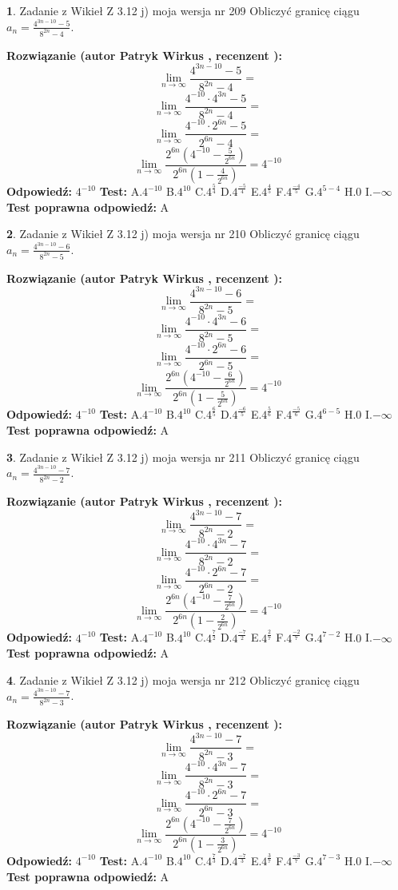 \documentclass[12pt, a4paper]{article}
\theoremstyle{definition} %
\newtheorem{zad}{}
\newcommand{\zadStart}[1]{\begin{zad}#1\newline}
\newcommand{\zadStop}{\end{zad}}
\newcommand{\rozwStart}[2]{\noindent \textbf{Rozwiązanie (autor #1 , recenzent #2): }\newline}
\newcommand{\rozwStop}{\newline}
\newcommand{\odpStart}{\noindent \textbf{Odpowiedź:}\newline}
\newcommand{\odpStop}{\newline}
\newcommand{\testStart}{\noindent \textbf{Test:}\newline}
\newcommand{\testStop}{\newline}
\newcommand{\kluczStart}{\noindent \textbf{Test poprawna odpowiedź:}\newline}
\newcommand{\kluczStop}{\newline}
\begin{document}
\zadStart{Zadanie z Wikieł Z 3.12 j) moja wersja nr 209}
Obliczyć granicę ciągu $a_{n}=\frac{4^{3n-10}-5}{8^{2n}-4}$.
\zadStop
\rozwStart{Patryk Wirkus}{}
$$\lim\limits_{n\to\infty}\frac{4^{3n-10}-5}{8^{2n}-4}=$$
$$\lim\limits_{n\to\infty}\frac{4^{-10} \cdot 4^{3n}-5}{8^{2n}-4}=$$
$$\lim\limits_{n\to\infty}\frac{4^{-10} \cdot 2^{6n}-5}{2^{6n}-4}=$$
$$\lim\limits_{n\to\infty}\frac{2^{6n}(4^{-10} - \frac{5}{2^{6n}})}{2^{6n}(1-\frac{4}{2^{6n}})}= 4^{-10}$$
\rozwStop
\odpStart
$4^{-10}$
\odpStop
\testStart
A.$4^{-10}$
B.$4^{10}$
C.$4^{\frac{5}{4}}$
D.$4^{\frac{-5}{4}}$
E.$4^{\frac{4}{5}}$
F.$4^{\frac{-4}{5}}$
G.$4^{5-4}$
H.$0$
I.$-\infty$
\testStop
\kluczStart
A
\kluczStop



\zadStart{Zadanie z Wikieł Z 3.12 j) moja wersja nr 210}
Obliczyć granicę ciągu $a_{n}=\frac{4^{3n-10}-6}{8^{2n}-5}$.
\zadStop
\rozwStart{Patryk Wirkus}{}
$$\lim\limits_{n\to\infty}\frac{4^{3n-10}-6}{8^{2n}-5}=$$
$$\lim\limits_{n\to\infty}\frac{4^{-10} \cdot 4^{3n}-6}{8^{2n}-5}=$$
$$\lim\limits_{n\to\infty}\frac{4^{-10} \cdot 2^{6n}-6}{2^{6n}-5}=$$
$$\lim\limits_{n\to\infty}\frac{2^{6n}(4^{-10} - \frac{6}{2^{6n}})}{2^{6n}(1-\frac{5}{2^{6n}})}= 4^{-10}$$
\rozwStop
\odpStart
$4^{-10}$
\odpStop
\testStart
A.$4^{-10}$
B.$4^{10}$
C.$4^{\frac{6}{5}}$
D.$4^{\frac{-6}{5}}$
E.$4^{\frac{5}{6}}$
F.$4^{\frac{-5}{6}}$
G.$4^{6-5}$
H.$0$
I.$-\infty$
\testStop
\kluczStart
A
\kluczStop



\zadStart{Zadanie z Wikieł Z 3.12 j) moja wersja nr 211}
Obliczyć granicę ciągu $a_{n}=\frac{4^{3n-10}-7}{8^{2n}-2}$.
\zadStop
\rozwStart{Patryk Wirkus}{}
$$\lim\limits_{n\to\infty}\frac{4^{3n-10}-7}{8^{2n}-2}=$$
$$\lim\limits_{n\to\infty}\frac{4^{-10} \cdot 4^{3n}-7}{8^{2n}-2}=$$
$$\lim\limits_{n\to\infty}\frac{4^{-10} \cdot 2^{6n}-7}{2^{6n}-2}=$$
$$\lim\limits_{n\to\infty}\frac{2^{6n}(4^{-10} - \frac{7}{2^{6n}})}{2^{6n}(1-\frac{2}{2^{6n}})}= 4^{-10}$$
\rozwStop
\odpStart
$4^{-10}$
\odpStop
\testStart
A.$4^{-10}$
B.$4^{10}$
C.$4^{\frac{7}{2}}$
D.$4^{\frac{-7}{2}}$
E.$4^{\frac{2}{7}}$
F.$4^{\frac{-2}{7}}$
G.$4^{7-2}$
H.$0$
I.$-\infty$
\testStop
\kluczStart
A
\kluczStop



\zadStart{Zadanie z Wikieł Z 3.12 j) moja wersja nr 212}
Obliczyć granicę ciągu $a_{n}=\frac{4^{3n-10}-7}{8^{2n}-3}$.
\zadStop
\rozwStart{Patryk Wirkus}{}
$$\lim\limits_{n\to\infty}\frac{4^{3n-10}-7}{8^{2n}-3}=$$
$$\lim\limits_{n\to\infty}\frac{4^{-10} \cdot 4^{3n}-7}{8^{2n}-3}=$$
$$\lim\limits_{n\to\infty}\frac{4^{-10} \cdot 2^{6n}-7}{2^{6n}-3}=$$
$$\lim\limits_{n\to\infty}\frac{2^{6n}(4^{-10} - \frac{7}{2^{6n}})}{2^{6n}(1-\frac{3}{2^{6n}})}= 4^{-10}$$
\rozwStop
\odpStart
$4^{-10}$
\odpStop
\testStart
A.$4^{-10}$
B.$4^{10}$
C.$4^{\frac{7}{3}}$
D.$4^{\frac{-7}{3}}$
E.$4^{\frac{3}{7}}$
F.$4^{\frac{-3}{7}}$
G.$4^{7-3}$
H.$0$
I.$-\infty$
\testStop
\kluczStart
A
\kluczStop
\end{document}
